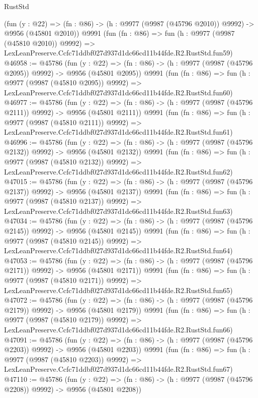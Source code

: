 \begin{lexlean}{RustStd}
\begin{coremodule}
    (fun (y : @22) =>
    (fn : @86) -> (h : @9977 (@9987 (@45796 @2010)) @9992) -> @9956 (@45801 @2010))
    @9991
    (fun (fn : @86) =>
    fun (h : @9977 (@9987 (@45810 @2010)) @9992) =>
    LexLeanPreserve.Ccfc71ddbf027d937d1dc66cd11b44fde.R2.RustStd.fun59)
@46958 := @45786
    (fun (y : @22) =>
    (fn : @86) -> (h : @9977 (@9987 (@45796 @2095)) @9992) -> @9956 (@45801 @2095))
    @9991
    (fun (fn : @86) =>
    fun (h : @9977 (@9987 (@45810 @2095)) @9992) =>
    LexLeanPreserve.Ccfc71ddbf027d937d1dc66cd11b44fde.R2.RustStd.fun60)
@46977 := @45786
    (fun (y : @22) =>
    (fn : @86) -> (h : @9977 (@9987 (@45796 @2111)) @9992) -> @9956 (@45801 @2111))
    @9991
    (fun (fn : @86) =>
    fun (h : @9977 (@9987 (@45810 @2111)) @9992) =>
    LexLeanPreserve.Ccfc71ddbf027d937d1dc66cd11b44fde.R2.RustStd.fun61)
@46996 := @45786
    (fun (y : @22) =>
    (fn : @86) -> (h : @9977 (@9987 (@45796 @2132)) @9992) -> @9956 (@45801 @2132))
    @9991
    (fun (fn : @86) =>
    fun (h : @9977 (@9987 (@45810 @2132)) @9992) =>
    LexLeanPreserve.Ccfc71ddbf027d937d1dc66cd11b44fde.R2.RustStd.fun62)
@47015 := @45786
    (fun (y : @22) =>
    (fn : @86) -> (h : @9977 (@9987 (@45796 @2137)) @9992) -> @9956 (@45801 @2137))
    @9991
    (fun (fn : @86) =>
    fun (h : @9977 (@9987 (@45810 @2137)) @9992) =>
    LexLeanPreserve.Ccfc71ddbf027d937d1dc66cd11b44fde.R2.RustStd.fun63)
@47034 := @45786
    (fun (y : @22) =>
    (fn : @86) -> (h : @9977 (@9987 (@45796 @2145)) @9992) -> @9956 (@45801 @2145))
    @9991
    (fun (fn : @86) =>
    fun (h : @9977 (@9987 (@45810 @2145)) @9992) =>
    LexLeanPreserve.Ccfc71ddbf027d937d1dc66cd11b44fde.R2.RustStd.fun64)
@47053 := @45786
    (fun (y : @22) =>
    (fn : @86) -> (h : @9977 (@9987 (@45796 @2171)) @9992) -> @9956 (@45801 @2171))
    @9991
    (fun (fn : @86) =>
    fun (h : @9977 (@9987 (@45810 @2171)) @9992) =>
    LexLeanPreserve.Ccfc71ddbf027d937d1dc66cd11b44fde.R2.RustStd.fun65)
@47072 := @45786
    (fun (y : @22) =>
    (fn : @86) -> (h : @9977 (@9987 (@45796 @2179)) @9992) -> @9956 (@45801 @2179))
    @9991
    (fun (fn : @86) =>
    fun (h : @9977 (@9987 (@45810 @2179)) @9992) =>
    LexLeanPreserve.Ccfc71ddbf027d937d1dc66cd11b44fde.R2.RustStd.fun66)
@47091 := @45786
    (fun (y : @22) =>
    (fn : @86) -> (h : @9977 (@9987 (@45796 @2203)) @9992) -> @9956 (@45801 @2203))
    @9991
    (fun (fn : @86) =>
    fun (h : @9977 (@9987 (@45810 @2203)) @9992) =>
    LexLeanPreserve.Ccfc71ddbf027d937d1dc66cd11b44fde.R2.RustStd.fun67)
@47110 := @45786
    (fun (y : @22) =>
    (fn : @86) -> (h : @9977 (@9987 (@45796 @2208)) @9992) -> @9956 (@45801 @2208))

\end{coremodule}
\end{lexlean}
